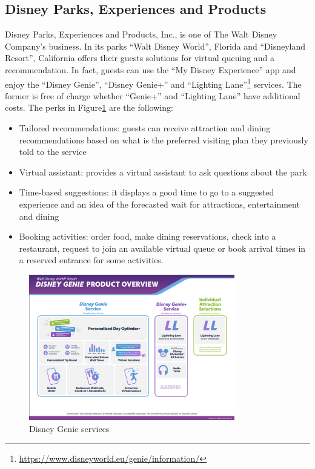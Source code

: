 \subsection{Disney Parks, Experiences and Products}\label{subsec:disney-parks-experiences-and-products}
Disney Parks, Experiences and Products, Inc., is one of The Walt Disney Company's business.
In its parks ``Walt Disney World'', Florida and ``Disneyland Resort'', California offers their guests solutions
for virtual queuing and a recommendation.
In fact, guests can use the ``My Disney Experience'' app and enjoy the ``Disney Genie'', ``Disney Genie+'' and ``Lighting Lane''\footnote{\url{https://www.disneyworld.eu/genie/information/}} services.
The former is free of charge whether ``Genie+'' and ``Lighting Lane'' have additional costs.
The perks in Figure\ref{fig:dgenie} are the following:

\begin{itemize}
	\item Tailored recommendations: guests can receive attraction and dining recommendations based on what is the preferred visiting plan they previously told
	      to the service
	\item Virtual assistant: provides a virtual assistant to ask questions about the park
	\item Time-based suggestions: it displays a good time to go to a suggested experience and an idea of the forecasted wait for attractions, entertainment and dining
	\item Booking activities: order food, make dining reservations, check into a restaurant, request to join an available virtual queue or book arrival times in a reserved entrance for
	      some activities.
\end{itemize}

\begin{figure}[H]
	\centering
	\includegraphics[width=0.8\textwidth]{img/dgenie}
	\caption{Disney Genie services}
	\label{fig:dgenie}
\end{figure}
